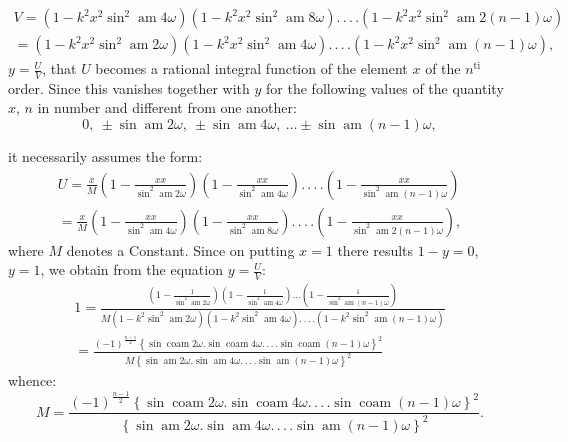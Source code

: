 \documentclass{article}
\begin{document}
\[
\begin{gathered}
V=\left(1-k^{2}x^{2}\sin^{2}\operatorname{am}4\omega\right)\left(1-k^{2}x^{2}\sin^{2}\operatorname{am}8\omega\right).\,.\,.\,.\left(1-k^{2}x^{2}\sin^{2}\operatorname{am}2(n-1)\omega\right)\\[1.5ex]
=\left(1-k^{2}x^{2}\sin^{2}\operatorname{am}2\omega\right)\left(1-k^{2}x^{2}\sin^{2}\operatorname{am}4\omega\right).\,.\,.\,.\left(1-k^{2}x^{2}\sin^{2}\operatorname{am}(n-1)\omega\right),
\end{gathered}
\]
$y=\frac{U}{V}$, that $U$ becomes a rational integral function of the element $x$ of the $n^{\mathrm{ti}}$ order. Since this vanishes together with $y$ for the following values of the quantity $x$, $n$ in number and different from one another:
\[
0,\ \pm\sin\operatorname{am}2\omega,\ \pm\sin\operatorname{am}4\omega,\ \ldots\pm\sin\operatorname{am}(n-1)\omega,
\]

it necessarily assumes the form:
\[
\begin{gathered}
U=\frac{x}{M}\left(1-\frac{xx}{\sin^{2}\operatorname{am}2\omega}\right)\left(1-\frac{xx}{\sin^{2}\operatorname{am}4\omega}\right).\,.\,.\,.\left(1-\frac{xx}{\sin^{2}\operatorname{am}(n-1)\omega}\right)\\[1.5ex]
=\frac{x}{M}\left(1-\frac{xx}{\sin^{2}\operatorname{am}4\omega}\right)\left(1-\frac{xx}{\sin^{2}\operatorname{am}8\omega}\right).\,.\,.\,.\left(1-\frac{xx}{\sin^{2}\operatorname{am}2(n-1)\omega}\right),
\end{gathered}
\]
where $M$ denotes a Constant. Since on putting $x=1$ there results $1-y=0$, $y=1$, we obtain from the equation $y=\frac{U}{V}$:
\[
\begin{gathered}
1=\frac{\left(1-\frac{1}{\sin^{2}\operatorname{am}2\omega}\right)\left(1-\frac{1}{\sin^{2}\operatorname{am}4\omega}\right)\ldots\left(1-\frac{1}{\sin^{2}\operatorname{am}(n-1)\omega}\right)}{M\left(1-k^{2}\sin^{2}\operatorname{am}2\omega\right)\left(1-k^{2}\sin^{2}\operatorname{am}4\omega\right).\,.\,.\,.\left(1-k^{2}\sin^{2}\operatorname{am}(n-1)\omega\right)}\\[1.5ex]
=\frac{(-1)^{\frac{n-1}{2}}\left\{\sin\operatorname{coam}2\omega.\sin\operatorname{coam}4\omega.\,.\,.\,.\sin\operatorname{coam}(n-1)\omega\right\}^{2}}{M\left\{\sin\operatorname{am}2\omega.\sin\operatorname{am}4\omega.\,.\,.\,.\sin\operatorname{am}(n-1)\omega\right\}^{2}}
\end{gathered}
\]
whence:
\[
M=\frac{(-1)^{\frac{n-1}{2}}\left\{\sin\operatorname{coam}2\omega.\sin\operatorname{coam}4\omega.\,.\,.\,.\sin\operatorname{coam}(n-1)\omega\right\}^{2}}{\left\{\sin\operatorname{am}2\omega.\sin\operatorname{am}4\omega.\,.\,.\,.\sin\operatorname{am}(n-1)\omega\right\}^{2}}.
\]
\end{document}
